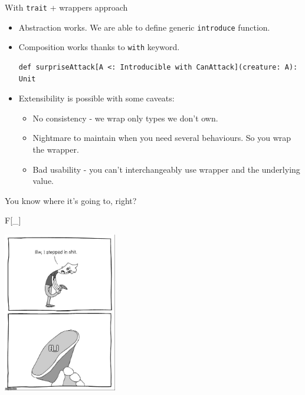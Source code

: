 \documentclass[presentation,aspectratio=169,smaller]{beamer}
\begin{document}
\begin{frame}[label={sec:org34ef72b},fragile]{With \texttt{trait} + wrappers approach}
 \begin{itemize}
\item Abstraction works. We are able to define generic \texttt{introduce} function.
\item Composition works thanks to \texttt{with} keyword.
\begin{verbatim}
def surpriseAttack[A <: Introducible with CanAttack](creature: A): Unit
\end{verbatim}
\item Extensibility is possible with some caveats:
\begin{itemize}
\item No consistency - we wrap only types we don't own.
\item Nightmare to maintain when you need several behaviours. So you wrap the
wrapper.
\item Bad usability - you can’t interchangeably use wrapper and the underlying
value.
\end{itemize}
\end{itemize}

\pause

You know where it’s going to, right?
\end{frame}

\begin{frame}[label={sec:org3f8a382}]{F[\_]}
\begin{center}
\includegraphics[height=7cm]{images/f_.jpg}
\end{center}
\end{frame}
\end{document}
